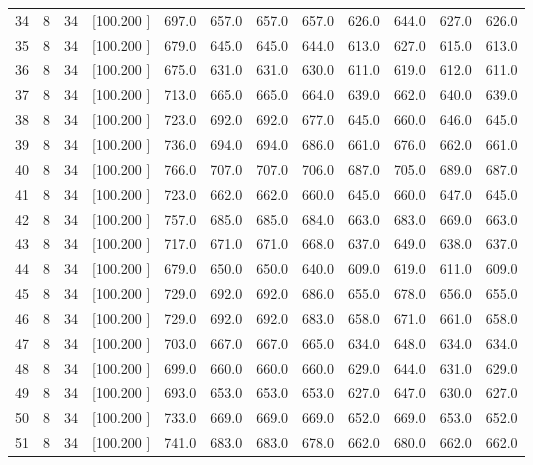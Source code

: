 \documentclass[12pt,a4paper]{article}
\begin{document}
\begin{center}
{\begin{tabular}{r r r r r r r r r r r r}
  34&  8& 34&[100.200   ]&   697.0&   657.0&   657.0&   657.0&   626.0&   644.0&   627.0&   626.0\\[-0.02in]
  35&  8& 34&[100.200   ]&   679.0&   645.0&   645.0&   644.0&   613.0&   627.0&   615.0&   613.0\\[-0.02in]
  36&  8& 34&[100.200   ]&   675.0&   631.0&   631.0&   630.0&   611.0&   619.0&   612.0&   611.0\\[-0.02in]
  37&  8& 34&[100.200   ]&   713.0&   665.0&   665.0&   664.0&   639.0&   662.0&   640.0&   639.0\\[-0.02in]
  38&  8& 34&[100.200   ]&   723.0&   692.0&   692.0&   677.0&   645.0&   660.0&   646.0&   645.0\\[-0.02in]
  39&  8& 34&[100.200   ]&   736.0&   694.0&   694.0&   686.0&   661.0&   676.0&   662.0&   661.0\\[-0.02in]
  40&  8& 34&[100.200   ]&   766.0&   707.0&   707.0&   706.0&   687.0&   705.0&   689.0&   687.0\\[-0.02in]
  41&  8& 34&[100.200   ]&   723.0&   662.0&   662.0&   660.0&   645.0&   660.0&   647.0&   645.0\\[-0.02in]
  42&  8& 34&[100.200   ]&   757.0&   685.0&   685.0&   684.0&   663.0&   683.0&   669.0&   663.0\\[-0.02in]
  43&  8& 34&[100.200   ]&   717.0&   671.0&   671.0&   668.0&   637.0&   649.0&   638.0&   637.0\\[-0.02in]
  44&  8& 34&[100.200   ]&   679.0&   650.0&   650.0&   640.0&   609.0&   619.0&   611.0&   609.0\\[-0.02in]
  45&  8& 34&[100.200   ]&   729.0&   692.0&   692.0&   686.0&   655.0&   678.0&   656.0&   655.0\\[-0.02in]
  46&  8& 34&[100.200   ]&   729.0&   692.0&   692.0&   683.0&   658.0&   671.0&   661.0&   658.0\\[-0.02in]
  47&  8& 34&[100.200   ]&   703.0&   667.0&   667.0&   665.0&   634.0&   648.0&   634.0&   634.0\\[-0.02in]
  48&  8& 34&[100.200   ]&   699.0&   660.0&   660.0&   660.0&   629.0&   644.0&   631.0&   629.0\\[-0.02in]
  49&  8& 34&[100.200   ]&   693.0&   653.0&   653.0&   653.0&   627.0&   647.0&   630.0&   627.0\\[-0.02in]
  50&  8& 34&[100.200   ]&   733.0&   669.0&   669.0&   669.0&   652.0&   669.0&   653.0&   652.0\\[-0.02in]
  51&  8& 34&[100.200   ]&   741.0&   683.0&   683.0&   678.0&   662.0&   680.0&   662.0&   662.0\\[-0.02in]

\end{tabular}}
\end{center}
\end{document}
